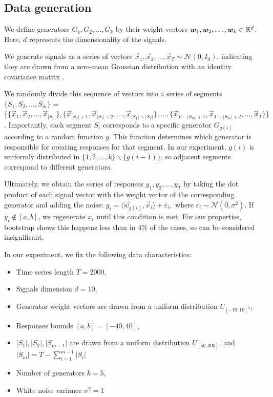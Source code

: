 \documentclass[12pt, twoside]{article}
\begin{document}
\subsection{Data generation}

We define generators $G_1, G_2, \dots, G_k$ by their weight vectors $\boldsymbol{w}_1, \boldsymbol{w}_2, \dots, \boldsymbol{w}_k \in \mathbb{R}^d$. 
Here, $d$ represents the dimensionality of the signals.

We generate signals as a series of vectors $\vec x_1, \vec x_2, \dots, \vec x_T \sim \mathcal{N}(0, I_d)$, indicating they are drawn from a zero-mean Gaussian distribution with an identity covariance matrix .

We randomly divide this sequence of vectors into a series of segments $\{S_1, S_2, \dots, S_m\}$ = $\{\{ \vec x_1, \vec x_2, \dots, \vec x_{|S_1|}\}, \{\vec x_{|S_1|+1}, \vec x_{|S_1|+2}, \dots, \vec x_{|S_1| + |S_2|}\}, \dots, \{\vec x_{T-|S_m|+1}, \vec x_{T-|S_m|+2}, \dots, \vec x_{T}\}\}$. 
Importantly, each segment $S_i$ corresponds to a specific generator $G_{g(i)}$ according to a random function $g$. 
This function determines which generator is responsible for creating responses for that segment. In our experiment, $g(i)$ is uniformly distributed in $\{1, 2, \dots, k\} \backslash \{g(i-1)\}$, so adjacent segments correspond to different generators.

Ultimately, we obtain the series of responses $y_1, y_2, \dots, y_T$ by taking the dot product of each signal vector with the weight vector of the corresponding  generator and adding the noise: $y_i = \langle \vec w_{g(i)}, \vec x_i \rangle + \varepsilon_i,$ where $\varepsilon_i \sim \mathcal{N}(0, \sigma^2)$. If $y_i  \notin [a, b]$, we regenerate $x_i$ until this condition is met. For our properties, bootstrap shows this happens less than in $4\%$ of the cases, so can be considered insignificant.
\vspace{2mm}

In our experiment, we fix the following data characteristics:
\begin{itemize}
\item Time series length $T = 2000$,
\item Signals dimension $d=10$,
\item Generator weight vectors are drawn from a uniform distribution $U_{[-10, 10]^d}$,
\item Responses bounds $[a, b] = [-40, 40]$,
\item $|S_1|, |S_2|, |S_{m-1}|$ are drawn from a uniform distribution $U_{[50, 300]}$, and $|S_m| = T-\sum_{i=1}^{m-1}|S_i|$
\item Number of generators $k = 5$,
\item White noise variance $\sigma^2= 1$
\end{itemize}
\end{document}
